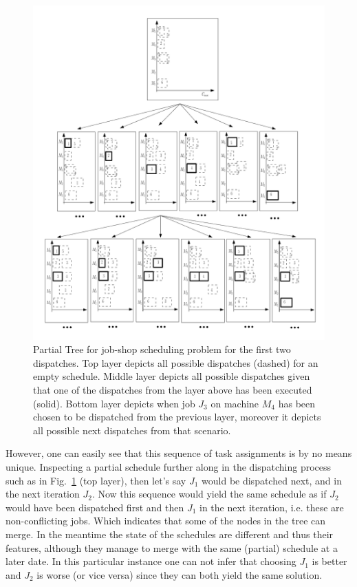 \documentclass{svjour3}                     %
\begin{document}
\begin{figure}[b!]
\includegraphics[width=\columnwidth]{gametree}
\caption[Partial Game Tree for JSP]{Partial Tree for job-shop scheduling problem for the first two dispatches. 
Top layer depicts all possible dispatches (dashed) for an empty schedule. 
Middle layer depicts all possible dispatches given that one of the dispatches from the layer above has been executed 
(solid). 
Bottom layer depicts when job $J_3$ on machine $M_4$ has been chosen to be dispatched from the previous layer, 
moreover it depicts all possible next dispatches from that scenario.}
\label{fig:jssp:gametree}
\end{figure}


However, one can easily see that this sequence of task assignments is by no means unique. Inspecting a partial 
schedule further along in the dispatching process such as in Fig.~\ref{fig:jssp:gametree} (top layer), then let's say 
$J_1$ 
would be dispatched next, and in the next iteration $J_2$. Now this sequence would yield the same schedule as if $J_2$ 
would have been dispatched first and then $J_1$ in the next iteration, i.e. these are non-conflicting jobs. Which 
indicates that some of the nodes in the tree can merge. In the meantime the state of the schedules are different and 
thus their features, although they manage to merge with the same (partial) schedule at a later date.  %
In this particular instance one can not infer that choosing $J_1$ is better and $J_2$ is worse (or vice versa) since they can both yield the same solution.
\end{document}
